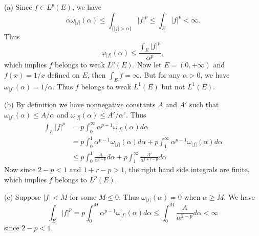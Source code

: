 \begin{exercise}{5.24}
(a) Since $f\in L^p(E)$,
we have \[\alpha\omega_{|f|}(\alpha)\leq\int_{\{|f|>\alpha\}}|f|^p\leq\int_E|f|^p<\infty.\]
Thus \[\omega_{|f|}(\alpha)\leq\frac{\int_E|f|^p}{\alpha^p},\]
which implies $f$ belongs to weak $L^p(E)$.
Now let $E=(0,+\infty)$ and $f(x)=1/x$ defined on $E$,
then $\int_E f=\infty$.
But for any $\alpha>0$, we have $\omega_{|f|}(\alpha)=1/\alpha$.
Thus $f$ belongs to weak $L^1(E)$ but not $L^1(E)$.

(b) By definition we have nonnegative constants $A$ and $A'$
such that $\omega_{|f|}(\alpha)\leq A/\alpha$ and $\omega_{|f|}(\alpha)\leq A'/\alpha^r$.
Thus
\begin{align*}
  \int_E|f|^p&=p\int_0^\infty\alpha^{p-1}\omega_{|f|}(\alpha)d\alpha\\
  &=p\int_0^1\alpha^{p-1}\omega_{|f|}(\alpha)d\alpha+p\int_1^\infty\alpha^{p-1}\omega_{|f|}(\alpha)d\alpha\\
  &\leq p\int_0^1\frac{A}{\alpha^{2-p}}d\alpha+p\int_1^\infty \frac{A'}{\alpha^{1+r-p}}d\alpha
\end{align*}
Now since $2-p<1$ and $1+r-p>1$,
the right hand side integrals are finite,
which implies $f$ belongs to $L^p(E)$.

(c) Suppose $|f|<M$ for some $M\leq 0$.
Thus $\omega_{|f|}(\alpha)=0$ when $\alpha\geq M$.
We have
\[\int_E|f|^p=p\int_0^M\alpha^{p-1}\omega_{|f|}(\alpha)d\alpha\leq\int_0^M\frac{A}{\alpha^{2-p}}d\alpha<\infty\]
since $2-p<1.$
\end{exercise}
